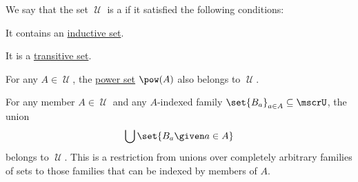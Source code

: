 \begin{definition}\label{def:grothendieck_universe}
  We say that the set \( \mscrU \) is a  if it satisfied the following conditions:
  \begin{thmenum}
     It contains an \hyperref[def:inductive_set]{inductive set}.

     It is a \hyperref[def:transitive_set]{transitive set}.

     For any \( A \in \mscrU \), the \hyperref[def:power_set]{power set} \( \pow(A) \) also belongs to \( \mscrU \).

     For any member \( A \in \mscrU \) and any \( A \)-indexed family \( \set{ B_a }_{a \in A} \subseteq \mscrU \), the union
    \begin{equation*}
      \bigcup\set{ B_a \given a \in A }
    \end{equation*}
    belongs to \( \mscrU \). This is a restriction from unions over completely arbitrary families of sets to those families that can be indexed by members of \( A \).
  \end{thmenum}


\end{definition}

